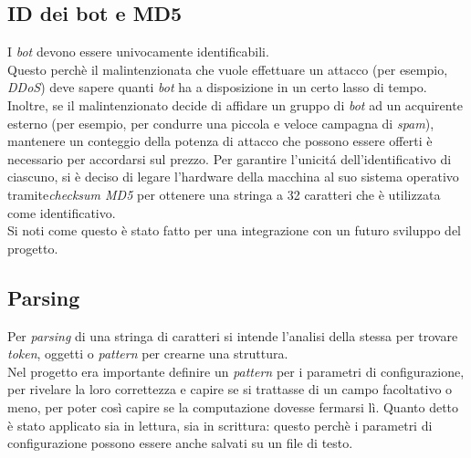 \vspace*{0.5cm}
\subsection{ID dei bot e MD5}
I \textit{bot} devono essere univocamente identificabili.\\ 
Questo perch\`e il malintenzionata che vuole effettuare un attacco (per esempio, \textit{DDoS}) deve sapere quanti \textit{bot} ha a disposizione in un certo lasso di tempo. Inoltre, se il malintenzionato decide di affidare un gruppo di \textit{bot} ad un acquirente esterno (per esempio, per condurre una piccola e veloce campagna di \textit{spam}), mantenere un conteggio della potenza di attacco che possono essere offerti \`e necessario per accordarsi sul prezzo. Per garantire l'unicit\'a dell'identificativo di ciascuno, si \`e deciso di legare l'hardware della macchina al suo sistema operativo tramite\textit{checksum MD5} per ottenere una stringa a 32 caratteri che \`e utilizzata come identificativo.\\
Si noti come questo \`e stato fatto per una integrazione con un futuro sviluppo del progetto.

\vspace*{0.5cm}
\subsection{Parsing}
Per \textit{parsing} di una stringa di caratteri si intende l'analisi della stessa per trovare \textit{token}, oggetti o \textit{pattern} per crearne una struttura.\\
Nel progetto era importante definire un \textit{pattern} per i parametri di configurazione, per rivelare la loro correttezza e capire se si trattasse di un campo facoltativo o meno, per poter cos\`i capire se la computazione dovesse fermarsi l\`i. Quanto detto \`e stato applicato sia in lettura, sia in scrittura: questo perch\`e i parametri di configurazione possono essere anche salvati su un file di testo.



